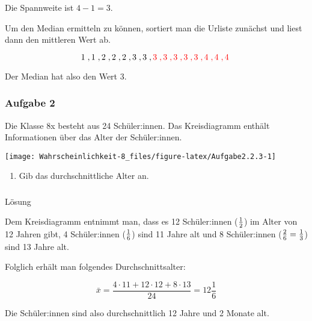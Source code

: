 \documentclass[
  ngerman,
]{book}
\providecommand{\tightlist}{%
  \setlength{\itemsep}{0pt}\setlength{\parskip}{0pt}}
\begin{document}
Die Spannweite ist \(4-1=3\).

Um den Median ermitteln zu können, sortiert man die Urliste zunächst und liest dann den mittleren Wert ab.

\[1\;, 1\;, 2\;, 2\;, 2\;, 3\;, 3\;, \color{red}{3}\;, 3\;, 3\;, 3\;, 3\;, 4\;, 4\;, 4\; \]

Der Median hat also den Wert 3.

\hypertarget{section-23}{%
\subsubsection*{}\label{section-23}}

\hypertarget{aufgabe-2-3}{%
\subsubsection*{Aufgabe 2}\label{aufgabe-2-3}}

Die Klasse 8x besteht aus 24 Schüler:innen. Das Kreisdiagramm enthält Informationen über das Alter der Schüler:innen.

\begin{center}\texttt{[image: Wahrscheinlichkeit-8\_files/figure-latex/Aufgabe2.2.3-1]} \end{center}

\begin{enumerate}
\def\labelenumi{\alph{enumi})}
\tightlist
\item
  Gib das durchschnittliche Alter an.
\end{enumerate}

\hypertarget{section-24}{%
\subsubsection*{}\label{section-24}}

Lösung

Dem Kreisdiagramm entnimmt man, dass es 12 Schüler:innen (\(1\over 2\)) im Alter von 12 Jahren gibt, 4 Schüler:innen (\(1 \over 6\)) sind 11 Jahre alt und 8 Schüler:innen (\({2 \over 6} = \frac{1}{3}\)) sind 13 Jahre alt.

Folglich erhält man folgendes Durchschnittsalter:

\[\bar{x}= \frac{4 \cdot 11 + 12 \cdot 12 + 8 \cdot 13}{24} = 12\frac{1}{6}\]

Die Schüler:innen sind also durchschnittlich 12 Jahre und 2 Monate alt.
\end{document}
